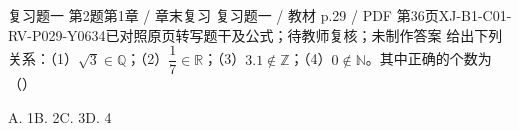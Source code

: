 \par\noindent\begin{minipage}{\linewidth}
\begin{bankitem}{复习题一 第2题}{第1章 / 章末复习 复习题一 / 教材 p.29 / PDF 第36页}{XJ-B1-C01-RV-P029-Y0634}{已对照原页转写题干及公式；待教师复核；未制作答案}
给出下列关系：（1）$\sqrt3\in\mathbb Q$；（2）$\dfrac17\in\mathbb R$；（3）$3.1\notin\mathbb Z$；（4）$0\notin\mathbb N$。其中正确的个数为（\quad）
\par A. 1\qquad B. 2\qquad C. 3\qquad D. 4
\end{bankitem}
\end{minipage}\par\medskip

